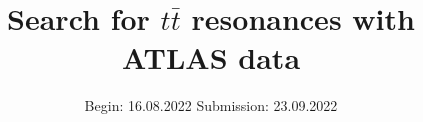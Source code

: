 


\title{Search for $t\bar{t}$ resonances with ATLAS data}
\date{%
  Begin: 16.08.2022
  \hspace{3em}
  Submission:  23.09.2022
}



\maketitle
\thispagestyle{empty}
\tableofcontents
\newpage






\printbibliography{}


